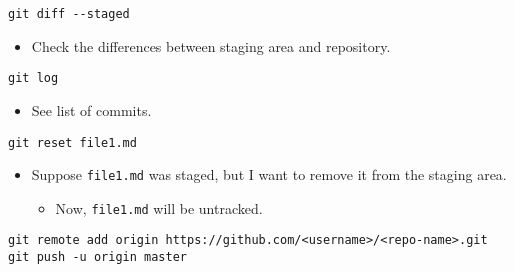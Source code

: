 \documentclass[]{book}
\providecommand{\tightlist}{%
  \setlength{\itemsep}{0pt}\setlength{\parskip}{0pt}}
\begin{document}
\begin{verbatim}
git diff --staged
\end{verbatim}

\begin{itemize}
\tightlist
\item
  Check the differences between staging area and repository.
\end{itemize}

\begin{verbatim}
git log
\end{verbatim}

\begin{itemize}
\tightlist
\item
  See list of commits.
\end{itemize}

\begin{verbatim}
git reset file1.md
\end{verbatim}

\begin{itemize}
\tightlist
\item
  Suppose \texttt{file1.md} was staged, but I want to remove it from the staging area.

  \begin{itemize}
  \tightlist
  \item
    Now, \texttt{file1.md} will be untracked.
  \end{itemize}
\end{itemize}

\begin{verbatim}
git remote add origin https://github.com/<username>/<repo-name>.git
git push -u origin master
\end{verbatim}
\end{document}
